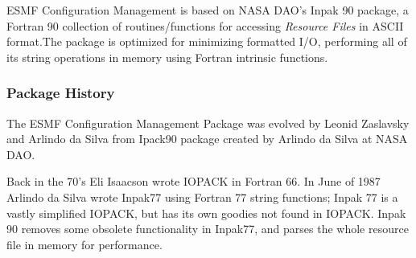 
\label{sec:Config}

ESMF Configuration Management is based on NASA DAO's 
Inpak 90 package, a Fortran 90 collection of routines/functions
for accessing {\em Resource Files} in ASCII format.The package 
is optimized for minimizing formatted I/O, performing all of its 
string operations in memory using Fortran intrinsic functions.\\

\subsubsection{Package History}

The ESMF Configuration Management Package was evolved by
Leonid Zaslavsky and Arlindo da Silva from Ipack90 package
created by Arlindo da Silva at NASA DAO.

Back in the 70's Eli Isaacson wrote IOPACK in Fortran
66.  In June of 1987 Arlindo da Silva wrote Inpak77 using
Fortran 77 string functions; Inpak 77 is a vastly
simplified IOPACK, but has its own goodies not found in
IOPACK.  Inpak 90 removes some obsolete functionality in
Inpak77, and parses the whole resource file in memory for
performance.

